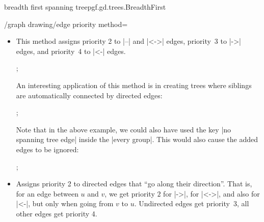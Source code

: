 \begin{gdalgorithm}{breadth first spanning tree}{pgf.gd.trees.BreadthFirst}
\begin{key}{/graph drawing/edge priority method=}
\begin{itemize}
      In practice, this means that the algorithm will favor
      forward-going edges and whenever a spanning tree can be computed
      using only the |->| edges, this spanning tree will be used. Only
      when these edges no longer suffice to build a spanning tree, we
      will also consider undirected or bidirected edges. The
      ``backward'' edges are only used as a last resort.
\begin{codeexample}[]
\tikz {};
\end{codeexample}
    \item {}
      
      This method assigns priority 2 to |--| and |<->| edges,
      priority~3 to |->| edges, and priority~4 to |<-| edges.
\begin{codeexample}[]
\tikz {};
\end{codeexample}
      An interesting application of this method is in creating trees
      where siblings are automatically connected by directed edges:
\begin{codeexample}[]
\tikz {};
\end{codeexample}     
      Note that in the above example, we could also have used the key
      |no spanning tree edge| inside the |every group|. This would
      also cause the added edges to be ignored:
\begin{codeexample}[]
\tikz {};
\end{codeexample}     
    \item {}
      
      Assigns priority 2 to directed edges that ``go along their
      direction''. That is, for an edge between $u$ and $v$, we get
      priority $2$ for |->|, for |<->|, and also for |<-|, but only
      when going from $v$ to $u$. Undirected edges get priority~3, all
      other edges get priority 4.


\end{itemize}
\end{key}
\end{gdalgorithm}
